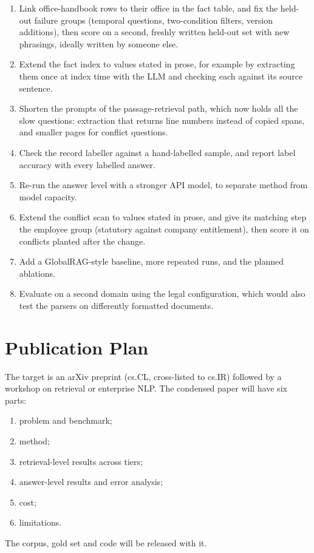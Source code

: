 \documentclass[11pt,letterpaper,oneside]{report}
\begin{document}
\begin{enumerate}
  \item Link office-handbook rows to their office in the fact table, and
  fix the held-out failure groups (temporal questions, two-condition
  filters, version additions), then score on a second, freshly written
  held-out set with new phrasings, ideally written by someone else.
  \item Extend the fact index to values stated in prose, for example by
  extracting them once at index time with the LLM and checking each against
  its source sentence.
  \item Shorten the prompts of the passage-retrieval path, which now holds
  all the slow questions: extraction that returns line numbers instead of
  copied spans, and smaller pages for conflict questions.
  \item Check the record labeller against a hand-labelled sample, and report
  label accuracy with every labelled answer.
  \item Re-run the answer level with a stronger API model, to separate
  method from model capacity.
  \item Extend the conflict scan to values stated in prose, and give its
  matching step the employee group (statutory against company entitlement),
  then score it on conflicts planted after the change.
  \item Add a GlobalRAG-style baseline, more repeated runs, and the planned
  ablations.
  \item Evaluate on a second domain using the legal configuration, which
  would also test the parsers on differently formatted documents.
\end{enumerate}

\section{Publication Plan}
\label{sec:publication}

The target is an arXiv preprint (cs.CL, cross-listed to cs.IR) followed by a
workshop on retrieval or enterprise NLP. The condensed paper will have six
parts:
\begin{enumerate}
  \item problem and benchmark;
  \item method;
  \item retrieval-level results across tiers;
  \item answer-level results and error analysis;
  \item cost;
  \item limitations.
\end{enumerate}
The corpus, gold set and code will be released with it.
\end{document}

